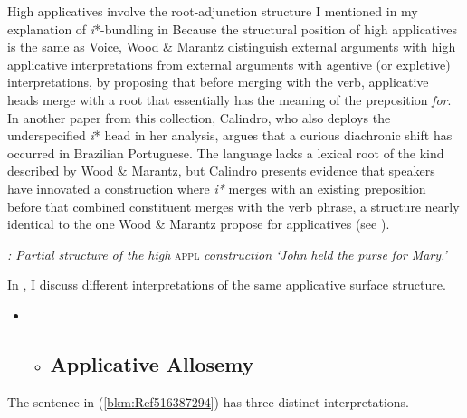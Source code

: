 \documentclass[output=paper,modfonts,nonflat]{langsci/langscibook}
\begin{document}
\begin{styleDefault}
High applicatives involve the root-adjunction structure I mentioned in my explanation of \textit{i}*-bundling in  Because the structural position of high applicatives is the same as Voice, Wood \& Marantz distinguish external arguments with high applicative interpretations from external arguments with agentive (or expletive) interpretations, by proposing that before merging with the verb, applicative heads merge with a root that essentially has the meaning of the preposition \textit{for}. In another paper from this collection, Calindro, who also deploys the underspecified \textit{i}* head in her analysis, argues that a curious diachronic shift has occurred in Brazilian Portuguese. The language lacks a lexical root of the kind described by Wood \& Marantz, but Calindro presents evidence that speakers have innovated a construction where \textit{i*} merges with an existing preposition before that combined constituent merges with the verb phrase, a structure nearly identical to the one Wood \& Marantz propose for applicatives (see ). 
\end{styleDefault}

\begin{styleDefault}
  
 
\end{styleDefault}

\begin{styleDefault}
\textit{: Partial structure of the high} \textsc{appl} \textit{construction} \textit{‘John} \textit{held} \textit{the} \textit{purse} \textit{for} \textit{Mary.’}
\end{styleDefault}

\begin{styleDefault}
In , I discuss different interpretations of the same applicative surface structure. 
\end{styleDefault}

\begin{itemize}
\item \begin{itemize}
\item \subsection{Applicative Allosemy}
\end{itemize}
\end{itemize}
\begin{styleDefault}
The sentence in (\ref{bkm:Ref516387294}) has three distinct interpretations. 
\end{styleDefault}
\end{document}
